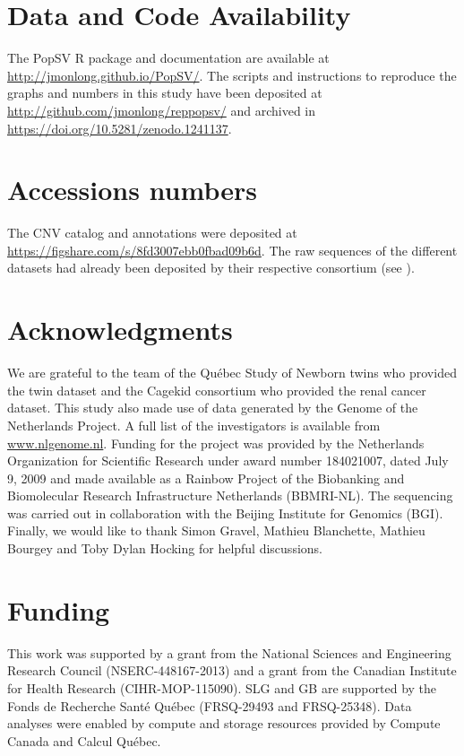 \section{Data and Code Availability}

The {\sf PopSV} R package and documentation are available at \url{http://jmonlong.github.io/PopSV/}.
The scripts and instructions to reproduce the graphs and numbers in this study have been deposited at \url{http://github.com/jmonlong/reppopsv/} and archived in \url{https://doi.org/10.5281/zenodo.1241137}.

\section{Accessions numbers}

The CNV catalog and annotations were deposited at \url{https://figshare.com/s/8fd3007ebb0fbad09b6d}.
The raw sequences of the different datasets had already been deposited by their respective consortium (see ).


\section{Acknowledgments}

We are grateful to the team of the Qu\'ebec Study of Newborn twins who provided the twin dataset and the Cagekid consortium who provided the renal cancer dataset.
This study also made use of data generated by the Genome of the Netherlands Project.
A full list of the investigators is available from \url{www.nlgenome.nl}.
Funding for the project was provided by the Netherlands Organization for Scientific Research under award number 184021007, dated July 9, 2009 and made available as a Rainbow Project of the Biobanking and Biomolecular Research Infrastructure Netherlands (BBMRI-NL).
The sequencing was carried out in collaboration with the Beijing Institute for Genomics (BGI).
Finally, we would like to thank Simon Gravel, Mathieu Blanchette, Mathieu Bourgey and Toby Dylan Hocking for helpful discussions.

\section{Funding}

This work was supported by a grant from the National Sciences and Engineering Research Council (NSERC-448167-2013) and a grant from the Canadian Institute for Health Research (CIHR-MOP-115090).
SLG and GB are supported by the Fonds de Recherche Sant\'e Qu\'ebec (FRSQ-29493 and FRSQ-25348).
Data analyses were enabled by compute and storage resources provided by Compute Canada and Calcul Qu\'ebec.


